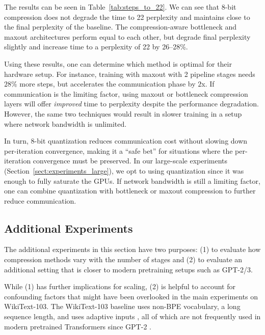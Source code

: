 The results can be seen in Table~\ref{tab:steps_to_22}. We can see that 8-bit compression does not degrade the time to 22 perplexity and maintains close to the final perplexity of the baseline. The compression-aware bottleneck and maxout architectures perform equal to each other, but degrade final perplexity slightly and increase time to a perplexity of 22 by 26--28\%.

Using these results, one can determine which method is optimal for their hardware setup. For instance, training with maxout with 2 pipeline stages needs $28\%$ more steps, but accelerates the communication phase by $2$x. If communication is the limiting factor, using maxout or bottleneck compression layers will offer {\it improved} time to perplexity despite the performance degradation. However, the same two techniques would result in slower training in a setup where network bandwidth is unlimited.

In turn, 8-bit quantization reduces communication cost without slowing down per-iteration convergence, making it a ``safe bet'' for situations where the per-iteration convergence must be preserved.
In our large-scale experiments (Section~\ref{sect:experiments_large}), we opt to using quantization since it was enough to fully saturate the GPUs.
If network bandwidth is still a limiting factor, one can combine quantization with bottleneck or maxout compression to further reduce communication.

\vspace{-6pt}
\subsection{Additional Experiments}\label{appendix:compression_extra}

The additional experiments in this section have two purposes: (1) to evaluate how compression methods vary with the number of stages and (2) to evaluate an additional setting that is closer to modern pretraining setups such as GPT-2/3.

While (1) has further implications for scaling, (2) is helpful to account for confounding factors that might have been overlooked in the main experiments on WikiText-103. The WikiText-103 baseline uses non-BPE vocabulary, a long sequence length, and uses adaptive inputs \citep{baevski2019adaptiveinputs}, all of which are not frequently used in modern pretrained Transformers since GPT-2 \citep{radford2019language}.

